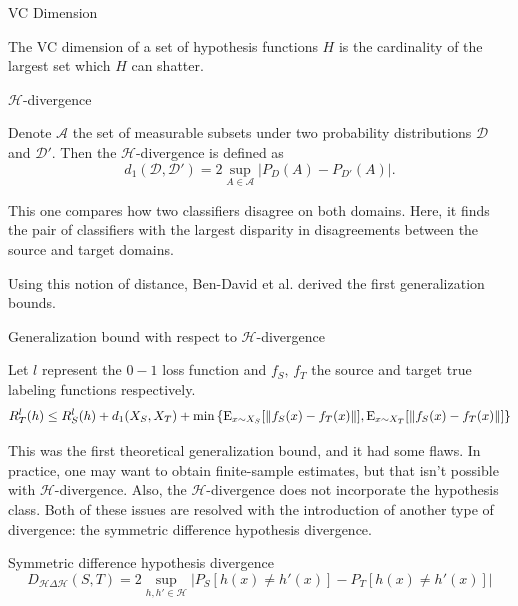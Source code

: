 \begin{definition}{VC Dimension}
	 
	 The VC dimension of a set of hypothesis functions $H$ is the cardinality of the largest set which $H$ can shatter.
	
\end{definition}

\begin{definition}{$\mathcal{H}$-divergence}
	
	Denote $\mathcal{A}$ the set of measurable subsets under two probability distributions $\mathcal{D}$ and $\mathcal{D'}$. Then the $\mathcal{H}$-divergence is defined as
	\[
	d_{1}(\mathcal{D},\mathcal{D'}) = 2 \sup_{A\in \mathcal{A}} \left| P_D(A)-P_{D'}(A) \right| .
	\]
\end{definition}

This one compares how two classifiers disagree on both domains. Here, it finds the pair of classifiers with the largest disparity in disagreements between the source and target domains.

Using this notion of distance, Ben-David et al. derived the first generalization bounds.

\begin{theorem}{Generalization bound with respect to $\mathcal{H}$-divergence \cite{Ben-David2007}}
	
	Let $l$ represent the $0-1$ loss function and $f_S,\,f_T$ the source and target true labeling functions respectively.
	\[
	R_T^{l}(h) \leq R_S^{l}(h) + d_1(X_S,X_T) + \min \left\{ \mathrm{E}_{x\sim X_S} [\left\|f_S(x)-f_T(x)\right\|], \mathrm{E}_{x\sim X_T} [\left\|f_S(x)-f_T(x)\right\|] \right\}
	\]

\end{theorem}

This was the first theoretical generalization bound, and it had some flaws. In practice, one may want to obtain finite-sample estimates, but that isn't possible with $\mathcal{H}$-divergence. Also, the $\mathcal{H}$-divergence does not incorporate the hypothesis class. Both of these issues are resolved with the introduction of another type of divergence: the symmetric difference hypothesis divergence.

\begin{definition}{Symmetric difference hypothesis divergence}
	\[
	D_{\mathcal{H}\Delta \mathcal{H}}(S,T) = 
	2 \sup_{h,h'\in \mathcal{H}} \left| P_S[h(x)\neq h'(x)] - P_T[h(x)\neq h'(x)] \right| 
	\]
\end{definition}

